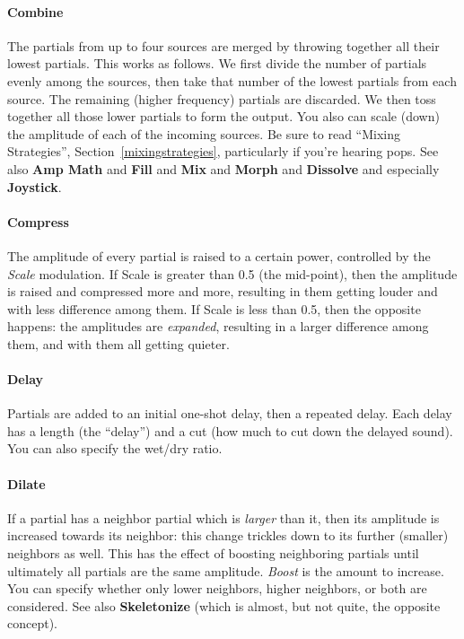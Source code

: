 \documentclass{article}
\begin{document}
\paragraph{Combine} The partials from up to four sources are merged by throwing together all their lowest partials.  This works as follows.  We first divide the number of partials evenly among the sources, then take that number of the lowest partials from each source.  The remaining (higher frequency) partials are discarded.  We then toss together all those lower partials to form the output.  You also can scale (down) the amplitude of each of the incoming sources.  Be sure to read ``Mixing Strategies'', Section~\ref{mixingstrategies}, particularly if you're hearing pops.  See also {\bf Amp Math} and {\bf Fill} and {\bf Mix} and {\bf Morph} and {\bf Dissolve} and especially {\bf Joystick}.

\paragraph{Compress}  The amplitude of every partial is raised to a certain power, controlled by the {\it Scale} modulation.  If Scale is greater than 0.5 (the mid-point), then the amplitude is raised and compressed more and more, resulting in them getting louder and with less difference among them.  If Scale is less than 0.5, then the opposite happens: the amplitudes are {\it expanded}, resulting in a larger difference among them, and with them all getting quieter.

\paragraph{Delay}  Partials are added to an initial one-shot delay, then a repeated delay.  Each delay has a length (the ``delay'') and a cut (how much to cut down the delayed sound).  You can also specify the wet/dry ratio.

\paragraph{Dilate} If a partial has a neighbor partial which is {\it larger} than it, then its amplitude is increased towards its neighbor: this change trickles down to its further (smaller) neighbors as well.  This has the effect of boosting neighboring partials until ultimately all partials are the same amplitude.  {\it Boost} is the amount to increase.  You can specify whether only lower neighbors, higher neighbors, or both are considered.  See also {\bf Skeletonize} (which is almost, but not quite, the opposite concept).
\end{document}
